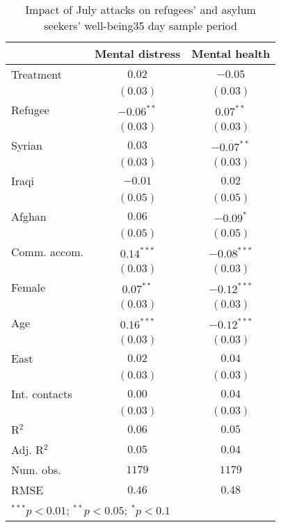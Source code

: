 
\begin{table}
\caption{Impact of July attacks on refugees' and asylum seekers' well-being35 day sample period}
\begin{center}
\begin{tabular}{l c c}
\toprule
 & Mental distress & Mental health \\
\midrule
Treatment     & $0.02$       & $-0.05$       \\
              & $(0.03)$     & $(0.03)$      \\
Refugee       & $-0.06^{**}$ & $0.07^{**}$   \\
              & $(0.03)$     & $(0.03)$      \\
Syrian        & $0.03$       & $-0.07^{**}$  \\
              & $(0.03)$     & $(0.03)$      \\
Iraqi         & $-0.01$      & $0.02$        \\
              & $(0.05)$     & $(0.05)$      \\
Afghan        & $0.06$       & $-0.09^{*}$   \\
              & $(0.05)$     & $(0.05)$      \\
Comm. accom.  & $0.14^{***}$ & $-0.08^{***}$ \\
              & $(0.03)$     & $(0.03)$      \\
Female        & $0.07^{**}$  & $-0.12^{***}$ \\
              & $(0.03)$     & $(0.03)$      \\
Age           & $0.16^{***}$ & $-0.12^{***}$ \\
              & $(0.03)$     & $(0.03)$      \\
East          & $0.02$       & $0.04$        \\
              & $(0.03)$     & $(0.03)$      \\
Int. contacts & $0.00$       & $0.04$        \\
              & $(0.03)$     & $(0.03)$      \\
\midrule
R$^2$         & $0.06$       & $0.05$        \\
Adj. R$^2$    & $0.05$       & $0.04$        \\
Num. obs.     & $1179$       & $1179$        \\
RMSE          & $0.46$       & $0.48$        \\
\bottomrule
\multicolumn{3}{l}{\scriptsize{$^{***}p<0.01$; $^{**}p<0.05$; $^{*}p<0.1$}}
\end{tabular}
\label{tab_mhealth_z_mcs}
\end{center}
\end{table}
